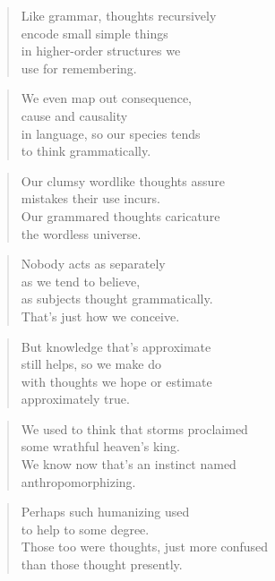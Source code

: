 \documentclass[10pt,a4paper]{article}
\begin{document}
\begin{paracol}{2}
\begin{verse}
Like grammar, thoughts recursively\\
encode small simple things\\
in higher-order structures we\\
use for remembering.
\end{verse}

\begin{verse}
We even map out consequence,\\
cause and causality\\
in language, so our species tends\\
to think grammatically.
\end{verse}

\begin{verse}
Our clumsy wordlike thoughts assure\\
mistakes their use incurs.\\
Our grammared thoughts caricature\\
the wordless universe.
\end{verse}

\begin{verse}
Nobody acts as separately\\
as we tend to believe,\\
as subjects thought grammatically.\\
That’s just how we conceive.
\end{verse}

\begin{verse}
But knowledge that’s approximate\\
still helps, so we make do\\
with thoughts we hope or estimate\\
approximately true.
\end{verse}

\begin{verse}
We used to think that storms proclaimed\\
some wrathful heaven’s king.\\
We know now that’s an instinct named\\
anthropomorphizing.
\end{verse}

\begin{verse}
Perhaps such humanizing used\\
to help to some degree.\\
Those too were thoughts, just more confused\\
than those thought presently.
\end{verse}


\end{paracol}
\end{document}
